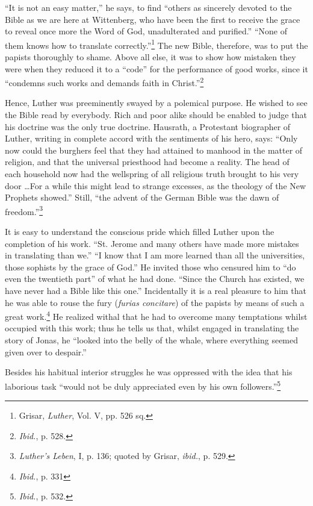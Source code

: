 “It is not an easy matter,” he says, to find “others as sincerely devoted
to the Bible as we are here at Wittenberg, who have been the first to receive
the grace to reveal once more the Word of God, unadulterated and purified.”
“None of them knows how to translate correctly.”\footnote{Grisar, \textit{Luther}, Vol. V, pp. 526 sq.}
 The new Bible, therefore,
was to put the papists thoroughly to shame. Above all else, it was to
show how mistaken they were when they reduced it to a “code” for the
performance of good works, since it “condemns such works and demands
faith in Christ.”\footnote{\textit{Ibid.}, p. 528.}

Hence, Luther was preeminently swayed by a polemical purpose. He
wished to see the Bible read by everybody. Rich and poor alike should be
enabled to judge that his doctrine was the only true doctrine. Hausrath,
a Protestant biographer of Luther, writing in complete accord with the
sentiments of his hero, says: “Only now could the burghers feel that they
had attained to manhood in the matter of religion, and that the universal
priesthood had become a reality. The head of each household now had the
wellspring of all religious truth brought to his very door \dots For a while
this might lead to strange excesses, as the theology of the New Prophets
showed.” Still, “the advent of the German Bible was the dawn of freedom.”\footnote{\textit{Luther’s Leben}, I, p. 136; quoted by Grisar, \textit{ibid.}, p. 529.}

It is easy to understand the conscious pride which filled Luther upon the
completion of his work. “St. Jerome and many others have made more mistakes in
translating than we.” “I know that I am more learned than all the universities,
those sophists by the grace of God.” He invited those who censured him to “do
even the twentieth part” of what he had done. “Since the Church has existed, we
have never had a Bible like this one.” Incidentally it is a real pleasure to
him that he was able to rouse the fury (\textit{furias concitare}) of the
papists by means of such a great work.\footnote{\textit{Ibid.}, p. 331} He
realized withal that he had to overcome many temptations whilst occupied with
this work; thus he tells us that, whilst engaged in translating the story of
Jonas, he “looked into the belly of the whale, where everything seemed given
over to despair.”

Besides his habitual interior struggles he was oppressed with the idea that his
laborious task “would not be duly appreciated even by his own
followers.”\footnote{\textit{Ibid.}, p. 532.}

